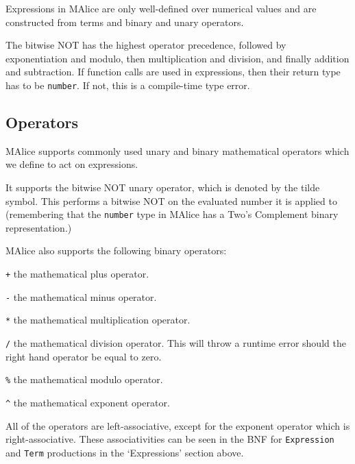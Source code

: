 \documentclass[a4wide, 11pt]{article}
\begin{document}
Expressions in MAlice are only well-defined over numerical values and are constructed from terms and binary and unary operators.

The bitwise NOT has the highest operator precedence, followed by exponentiation and modulo, then multiplication and division, and finally addition and subtraction. If function calls are used in expressions, then their return type has to be \texttt{number}. If not, this is a compile-time type error.

\subsection{Operators}

MAlice supports commonly used unary and binary mathematical operators which we define to act on expressions.

It supports the bitwise NOT unary operator, which is denoted by the tilde symbol. This performs a bitwise NOT on the evaluated number it is applied to (remembering that the \texttt{number} type in MAlice has a Two's Complement binary representation.)

MAlice also supports the following binary operators:

\begin{list}{} {
\setlength{\labelsep}{0.75cm}
\setlength{\leftmargin}{2cm}
}

\item[\texttt{+}] the mathematical plus operator.
\item[\texttt{-}] the mathematical minus operator.
\item[\texttt{*}] the mathematical multiplication operator.
\item[\texttt{/}] the mathematical division operator. This will throw a runtime error should the right hand operator be equal to zero.
\item[\texttt{\%}] the mathematical modulo operator.
\item[\texttt{\^}] the mathematical exponent operator.

\end{list}

All of the operators are left-associative, except for the exponent operator which is right-associative. These associativities can be seen in the BNF for \texttt{Expression} and \texttt{Term} productions in the `Expressions' section above.
\end{document}
